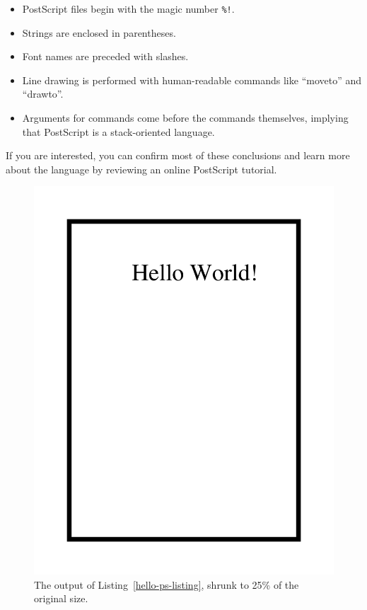 \begin{itemize}
\item PostScript files begin with the magic number \verb|%!|.
\item Strings are enclosed in parentheses. 
\item Font names are preceded with slashes. 
\item Line drawing is performed with human-readable commands like
  ``moveto'' and ``drawto''. 
\item Arguments for commands come before the commands themselves,
  implying that PostScript is a stack-oriented language.
\end{itemize}

If you are interested, you can confirm most of these conclusions and
learn more about the language by reviewing an online PostScript tutorial.

\label{hello-ps-listing}

\begin{figure}
\includegraphics[scale=.25]{ch-pdf/hello-ps.pdf}
\caption{The output of Listing~\ref{hello-ps-listing}, shrunk to 25\% of
  the original size.}\label{hello-ps-figure}
\end{figure}


